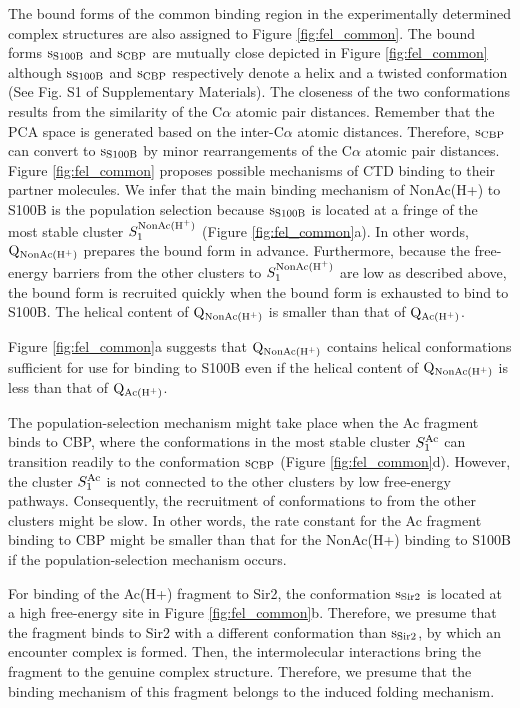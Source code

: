The bound forms of the common binding region in the experimentally determined complex structures are also assigned to Figure \ref{fig:fel_common}. 
The bound forms $\rm s_{S100B}$ and $\rm s_{CBP}$ are mutually close depicted in Figure \ref{fig:fel_common} although $\rm s_{S100B}$ and $\rm s_{CBP}$ respectively denote a helix and a twisted conformation (See Fig. S1 of Supplementary Materials). 
The closeness of the two conformations results from the similarity of the C$\alpha$ atomic pair distances. 
Remember that the PCA space is generated based on the inter-C$\alpha$ atomic distances. 
Therefore, $\rm s_{CBP}$ can convert to $\rm s_{S100B}$ by minor rearrangements of the C$\alpha$ atomic pair distances.
Figure \ref{fig:fel_common} proposes possible mechanisms of CTD binding to their partner molecules. 
We infer that the main binding mechanism of NonAc(H+) to S100B is the population selection because $\rm s_{S100B}$ is located at a fringe of the most stable cluster $S_1^{\rm NonAc(H^+)}$ (Figure \ref{fig:fel_common}a). 
In other words, $\rm Q_{NonAc(H^+)}$ prepares the bound form in advance. 
Furthermore, because the free-energy barriers from the other clusters to $S_1^{\rm NonAc(H^+)}$ are low as described above, the bound form is recruited quickly when the bound form is exhausted to bind to S100B. 
The helical content of $\rm Q_{NonAc(H^+)}$ is smaller than that of $\rm Q_{Ac(H^+)}$. 

Figure \ref{fig:fel_common}a suggests that $\rm Q_{NonAc(H^+)}$ contains helical conformations sufficient for use for binding to S100B even if the helical content of $\rm Q_{NonAc(H^+)}$ is less than that of $\rm Q_{Ac(H^+)}$.

The population-selection mechanism might take place when the Ac fragment binds to CBP, where the conformations in the most stable cluster $S_1^{\rm Ac}$ can transition readily to the conformation $\rm s_{CBP}$ (Figure \ref{fig:fel_common}d). 
However, the cluster $S_1^{\rm Ac}$ is not connected to the other clusters by low free-energy pathways. 
Consequently, the recruitment of conformations to  from the other clusters might be slow. 
In other words, the rate constant for the Ac fragment binding to CBP might be smaller than that for the NonAc(H+) binding to S100B if the population-selection mechanism occurs.

For binding of the Ac(H+) fragment to Sir2, the conformation $\rm s_{Sir2}$ is located at a high free-energy site in Figure \ref{fig:fel_common}b. 
Therefore, we presume that the fragment binds to Sir2 with a different conformation than $\rm s_{Sir2}$, by which an encounter complex is formed. 
Then, the intermolecular interactions bring the fragment to the genuine complex structure. 
Therefore, we presume that the binding mechanism of this fragment belongs to the induced folding mechanism.

